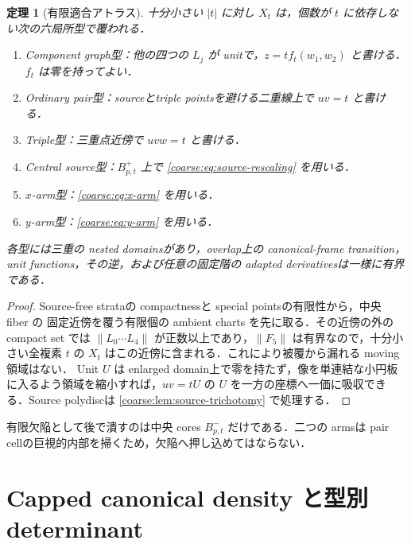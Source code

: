 \documentclass[a4paper,11pt]{ltjsarticle}
\numberwithin{equation}{section}
\theoremstyle{plain}
\newtheorem{theorem}{定理}[section]
\theoremstyle{definition}
\theoremstyle{remark}
\begin{document}
\begin{theorem}[有限適合アトラス]\label{coarse:thm:atlas}
十分小さい $|t|$ に対し $X_t$ は，個数が $t$ に依存しない次の六局所型で覆われる．
\begin{enumerate}[label=\textup{(\ensuremath{\mathsf{\Alph*}})}]
\item Component graph型：他の四つの $L_j$ が unitで，$z=tf_t(w_1,w_2)$ と書ける．$f_t$ は零を持ってよい．
\item Ordinary pair型：sourceとtriple pointsを避ける二重線上で $uv=t$ と書ける．
\item Triple型：三重点近傍で $uvw=t$ と書ける．
\item Central source型：$B_{p,t}^+$ 上で \eqref{coarse:eq:source-rescaling} を用いる．
\item $x$-arm型：\eqref{coarse:eq:x-arm} を用いる．
\item $y$-arm型：\eqref{coarse:eq:y-arm} を用いる．
\end{enumerate}
各型には三重の nested domainsがあり，overlap上の canonical-frame transition，unit functions，その逆，および任意の固定階の adapted derivativesは一様に有界である．
\end{theorem}

\begin{proof}
Source-free strataの compactnessと special pointsの有限性から，中央 fiber の
固定近傍を覆う有限個の ambient charts を先に取る．その近傍の外の compact set では
$\|L_0\cdots L_4\|$ が正数以上であり，$\|F_5\|$ は有界なので，十分小さい全複素 $t$ の
$X_t$ はこの近傍に含まれる．これにより被覆から漏れる moving 領域はない．
Unit $U$ は enlarged domain上で零を持たず，像を単連結な小円板に入るよう領域を縮小すれば，$uv=tU$ の $U$ を一方の座標へ一価に吸収できる．Source polydiscは \cref{coarse:lem:source-trichotomy} で処理する．
\end{proof}

\begin{remark}
有限欠陥として後で潰すのは中央 cores $B_{p,t}^-$ だけである．二つの armsは pair cellの巨視的内部を掃くため，欠陥へ押し込めてはならない．
\end{remark}

\section{Capped canonical density と型別 determinant}\label{coarse:sec:density}
\end{document}
